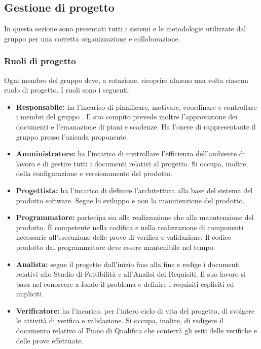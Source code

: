 \subsection{Gestione di progetto}
In questa sezione sono presentati tutti i sistemi e le metodologie utilizzate dal gruppo per una corretta organizzazione e collaborazione.
\subsubsection{Ruoli di progetto}
Ogni membro del gruppo deve, a rotazione, ricoprire almeno una volta ciascun ruolo di progetto.
I ruoli sono i seguenti:
\begin{itemize}
\item \textbf{Responsabile:} ha l'incarico di pianificare, motivare, coordinare e controllare i membri del gruppo \Gruppo.
Il suo compito prevede inoltre l'approvazione dei documenti e l'emanazione di piani e scadenze.
Ha l'onere di rappresentante il gruppo presso l'azienda proponente.
\item \textbf{Amministratore:} ha l'incarico di controllare l'efficienza dell'ambiente di lavoro e di gestire tutti i documenti relativi al progetto.
Si occupa, inoltre, della configurazione e versionamento del prodotto.
\item \textbf{Progettista:} ha l'incarico di definire l'architettura alla base del sistema del prodotto software.
Segue lo sviluppo e non la manutenzione del prodotto.
\item \textbf{Programmatore:} partecipa sia alla realizzazione che alla manutenzione del prodotto.
È competente nella codifica e nella realizzazione di componenti necessarie all’esecuzione delle prove di verifica e validazione.
Il codice prodotto dal programmatore deve essere mantenibile nel tempo.
\item \textbf{Analista:} segue il progetto dall'inizio fino alla fine e redige i documenti relativi allo Studio di Fattibilità e all'Analisi dei Requisiti.
Il suo lavoro si basa nel conoscere a fondo il problema e definire i requisiti espliciti ed impliciti.
\item \textbf{Verificatore:} ha l'incarico, per l'intero ciclo di vita del progetto, di svolgere le attività di verifica e validazione.
Si occupa, inoltre, di redigere il documento relativo al Piano di Qualifica che conterrà gli esiti delle verifiche e delle prove effettuate.
\end{itemize}

